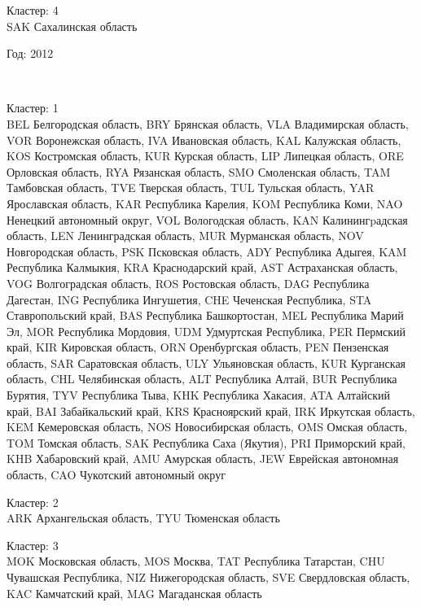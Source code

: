 \documentclass[11pt]{article}
\begin{document}
Кластер:  4 \\
SAK Сахалинская область

\begin{center}
Год:  2012
\end{center}

    \begin{center}
    \end{center}
    { \hspace*{\fill} \\}
    
Кластер:  1 \\
BEL Белгородская область, BRY Брянская область, VLA Владимирская область, VOR Воронежская область, IVA Ивановская область, KAL Калужская область, KOS Костромская область, KUR Курская область, LIP Липецкая область, ORE Орловская область, RYA Рязанская область, SMO Смоленская область, TAM Тамбовская область, TVE Тверская область, TUL Тульская область, YAR Ярославская область, KAR Республика Карелия, KOM Республика Коми, NAO Ненецкий автономный округ, VOL Вологодская область, KAN Калинингpадская область, LEN Ленинградская область, MUR Мурманская область, NOV Новгородская область, PSK Псковская область, ADY Республика Адыгея, KAM Республика Калмыкия, KRA Краснодарский край, AST Астраханская область, VOG Волгоградская область, ROS Ростовская область, DAG Республика Дагестан, ING Республика Ингушетия, CHE Чеченская Республика, STA Ставропольский край, BAS Республика Башкортостан, MEL Республика Марий Эл, MOR Республика Мордовия, UDM Удмуртская Республика, PER Пермский край, KIR Кировская область, ORN Оренбургская область, PEN Пензенская область, SAR Саратовская область, ULY Ульяновская область, KUR Курганская область, CHL Челябинская область, ALT Республика Алтай, BUR Республика Бурятия, TYV Республика Тыва, KHK Республика Хакасия, ATA Алтайский край, BAI Забайкальский край, KRS Красноярский край, IRK Иркутская область, KEM Кемеровская область, NOS Новосибирская область, OMS Омская область, TOM Томская область, SAK Республика Саха (Якутия), PRI Приморский край, KHB Хабаровский край, AMU Амурская область, JEW Еврейская автономная область, CAO Чукотский автономный округ

Кластер:  2 \\
ARK Архангельская область, TYU Тюменская область

Кластер:  3 \\
MOK Московская область, MOS Москва, TAT Республика Татарстан, CHU Чувашская Республика, NIZ Нижегородская область, SVE Свердловская область, KAC Камчатский край, MAG Магаданская область
\end{document}
